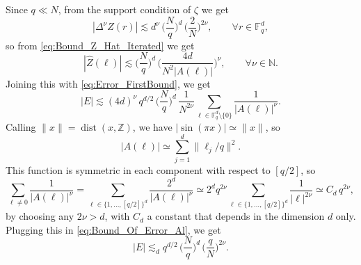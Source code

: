 \documentclass[11pt,reqno]{amsart}
\theoremstyle{definition}
\numberwithin{equation}{section}
\theoremstyle{remark}
\begin{document}
Since $q \ll N$, from the support condition of $\zeta$ we get
\begin{equation}
     |\Delta^\nu Z(r)| \lesssim d^\nu\, \Big(\frac{N}{q}\Big)^d \, \Big(\frac{2}{N}\Big)^{2\nu}, \qquad \forall r \in \mathbb F_q^d, 
\end{equation}
so from \eqref{eq:Bound_Z_Hat_Iterated} we get 
\begin{equation}
    |\widehat Z(\ell)| \lesssim  \Big(\frac{N}{q}\Big)^d \,   \Big(\frac{4d}{N^2 |A(\ell)|}\Big)^\nu, 
    \qquad \forall \nu \in \mathbb N.
\end{equation}
Joining this with \eqref{eq:Error_FirstBound}, we get
\begin{equation}\label{eq:Bound_Of_Error_Al}
    |E| \lesssim (4d)^\nu \,  q^{d/2} \, \Big(\frac{N}{q}\Big)^d \, \frac{1}{N^{2\nu}} \sum_{\ell \in \mathbb F_q^d \setminus \{0\}}   \frac{1}{ |A(\ell)|^\nu}.
\end{equation}
Calling $\lVert x \rVert = \operatorname{dist}(x,\mathbb Z)$, we have $|\sin(\pi x)| \simeq \lVert x \rVert$, so 
\begin{equation}
    |A(\ell)| \simeq \sum_{j=1}^d \lVert \ell_j/q \rVert^2.  
\end{equation}
This function is symmetric in each component with respect to $[q/2]$, so 
\begin{equation}
    \sum_{\ell \neq 0} \frac{1}{|A(\ell)|^\nu} 
    = \sum_{\ell \in \{1, \ldots, [q/2]\}^d} \frac{2^d}{|A(\ell)|^\nu}
    \simeq 2^d q^{2\nu} \sum_{\ell \in \{1, \ldots, [q/2]\}^d} \frac{1}{|\ell|^{2\nu} } \simeq C_d \, q^{2\nu}, 
\end{equation}
by choosing any $2\nu > d$, with $C_d$ a constant that depends in the dimension $d$ only.
Plugging this in \eqref{eq:Bound_Of_Error_Al}, we get 
\begin{equation}\label{eq:Error_Term}
    |E| \lesssim_d  q^{d/2} \, \Big(\frac{N}{q}\Big)^d \, \Big( \frac{q}{N}\Big)^{2\nu}.
\end{equation}
\end{document}
